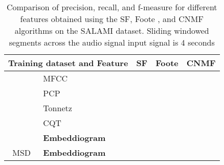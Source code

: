 \begin{table}
  \centering
  \begin{adjustbox}{width=\textwidth}
  \begin{threeparttable}
    \begin{tabular}{c|l|c|c|c} 
\toprule
     \multicolumn{2}{c|}{\textbf{Training dataset} and \textbf{Feature}}  & \multicolumn{1}{c}{\textbf{SF}} & \multicolumn{1}{c}{\textbf{Foote}} & \multicolumn{1}{c}{\textbf{CNMF}} 
     \\ \midrule 
    \multirow{5}{*}{}&   
         \multirow{1}{*}{MFCC } & \usebox{\mfccSF} & \usebox{\mfccFoote} & \usebox{\mfccCNMF} \\\cline{2-5}
        & \multirow{1}{*}{PCP} & \usebox{\pcpSF} & \usebox{\pcpFoote} & \usebox{\pcpCNMF} \\\cline{2-5}
        & \multirow{1}{*}{Tonnetz} & \usebox{\tonnetzSF} & \usebox{\tonnetzFoote} & \usebox{\tonnetzCNMF} \\\cline{2-5} 
        & \multirow{1}{*}{CQT} & \usebox{\cqtSF} & \usebox{\cqtFoote} & \usebox{\cqtCNMF} \\\cline{1-5} 
    \multirow{1}{*}{GTZAN \cite{GTZAN}}& 
        \multirow{1}{*}{\textbf{Embeddiogram}} & \usebox{\embeddioaSF} & \usebox{\embeddioaFoote} & \usebox{\embeddioaCNMF} \\\cline{1-5} 
    \multirow{1}{*}{MSD \cite{MSD}}& 
        \multirow{1}{*}{\textbf{Embeddiogram}} & \usebox{\embeddiobSF} & \usebox{\embeddiobFoote} & \usebox{\embeddiobCNMF} \\\bottomrule
    \end{tabular}
    \caption[Metric comparison: audio features and segmentation algorithms]{Comparison of precision, recall, and f-measure for different features obtained using the SF\cite{sf}, Foote \cite{Foote2000AutomaticNovelty}, and CNMF \cite{NietoCONVEXIDENTIFICATION} algorithms on the SALAMI dataset. Sliding windowed segments across the audio signal input signal is 4 seconds}\label{ta:results}
  \end{threeparttable}
  \end{adjustbox}
\end{table}




